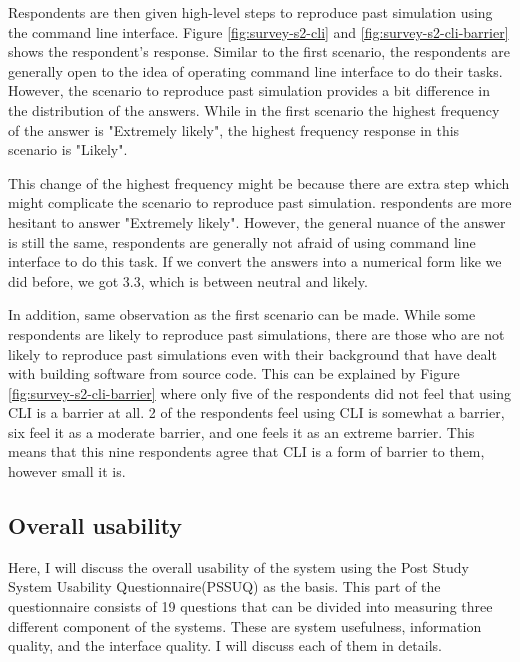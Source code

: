 \vspace{0.5cm}

Respondents are then given high-level steps to reproduce past simulation using the command line interface.  Figure \ref{fig:survey-s2-cli} and \ref{fig:survey-s2-cli-barrier} shows the respondent's response. Similar to the first scenario, the respondents are generally open to the idea of operating command line interface to do their tasks. However, the scenario to reproduce past simulation provides a bit difference in the distribution of the answers. While in the first scenario the highest frequency of the answer is "Extremely likely", the highest frequency response in this scenario is "Likely". 

This change of the highest frequency might be because there are extra step which might complicate the scenario to reproduce past simulation. respondents are more hesitant to answer "Extremely likely". However, the general nuance of the answer is still the same, respondents are generally not afraid of using command line interface to do this task. If we convert the answers into a numerical form like we did before, we got 3.3, which is between neutral and likely. 

In addition, same observation as the first scenario can be made. While some respondents are likely to reproduce past simulations, there are those who are not likely to reproduce past simulations even with their background that have dealt with building software from source code. This can be explained by Figure \ref{fig:survey-s2-cli-barrier} where only five of the respondents did not feel that using CLI is a barrier at all. 2 of the respondents feel using CLI is somewhat a barrier, six feel it as a moderate barrier, and one feels it as an extreme barrier. This means that this nine respondents agree that CLI is a form of barrier to them, however small it is.


\subsection{Overall usability}


Here, I will discuss the overall usability of the system using the Post Study System Usability Questionnaire(PSSUQ) as the basis. This part of the questionnaire consists of 19 questions that can be divided into measuring three different component of the systems. These are system usefulness, information quality, and the interface quality. I will discuss each of them in details.

